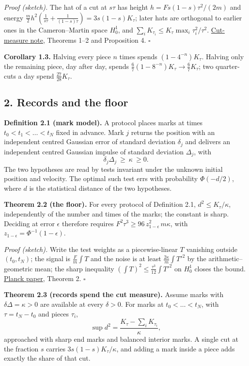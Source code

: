 \documentclass[11pt,a4paper]{article}
\begin{document}
\emph{Proof (sketch).} The hat of a cut at \(s\tau\) has height
\(h=F s(1-s)\tau^2/(2m)\) and energy
\(\frac m2h^2(\frac1{s\tau}+\frac1{(1-s)\tau})=3s(1-s)K_\tau\); later
hats are orthogonal to earlier ones in the Cameron--Martin space
\(H^1_0\), and \(\sum_iK_{\tau_i}\le K_\tau\max_i\tau_i^2/\tau^2\).
\href{cut-measure-newton.md}{Cut-measure note}, Theorems 1--2 and
Proposition 4. \(\square\)

\textbf{Corollary 1.3.} Halving every piece \(n\) times spends
\((1-4^{-n})K_\tau\). Halving only the remaining piece, day after day,
spends \(\frac67(1-8^{-n})K_\tau\to\frac67K_\tau\); two quarter-cuts a
day spend \(\frac{27}{28}K_\tau\).

\hypertarget{records-and-the-floor}{%
\subsection{2. Records and the floor}\label{records-and-the-floor}}

\textbf{Definition 2.1 (mark model).} A protocol places marks at times
\(t_0<t_1<\dots<t_N\) fixed in advance. Mark \(j\) returns the position
with an independent centred Gaussian error of standard deviation
\(\delta_j\) and delivers an independent centred Gaussian impulse of
standard deviation \(\Delta_j\), with
\[\delta_j\Delta_j\ \ge\ \kappa\ \ge0 .\] The two hypotheses are read by
tests invariant under the unknown initial position and velocity. The
optimal such test errs with probability \(\Phi(-d/2)\), where \(d\) is
the statistical distance of the two hypotheses.

\textbf{Theorem 2.2 (the floor).} For every protocol of Definition 2.1,
\(d^2\le K_\tau/\kappa\), independently of the number and times of the
marks; the constant is sharp. Deciding at error \(\epsilon\) therefore
requires \(F^2\tau^3\ge96\,z_{1-\epsilon}^2\,m\kappa\), with
\(z_{1-\epsilon}=\Phi^{-1}(1-\epsilon)\).

\emph{Proof (sketch).} Write the test weights as a piecewise-linear
\(T\) vanishing outside \((t_0,t_N)\); the signal is \(\frac Fm\int T\)
and the noise is at least \(\frac{2\kappa}m\int T'^2\) by the
arithmetic--geometric mean; the sharp inequality
\((\int T)^2\le\frac{\tau^3}{12}\int T'^2\) on \(H^1_0\) closes the
bound. \href{planck-gap-paper.md}{Planck paper}, Theorem 2. \(\square\)

\textbf{Theorem 2.3 (records spend the cut measure).} Assume marks with
\(\delta\Delta=\kappa>0\) are available at every \(\delta>0\). For marks
at \(t_0<\dots<t_N\), with \(\tau=t_N-t_0\) and pieces \(\tau_i\),
\[\sup d^2=\frac{K_\tau-\sum_iK_{\tau_i}}{\kappa},\] approached with
sharp end marks and balanced interior marks. A single cut at the
fraction \(s\) carries \(3s(1-s)K_\tau/\kappa\), and adding a mark
inside a piece adds exactly the share of that cut.
\end{document}
